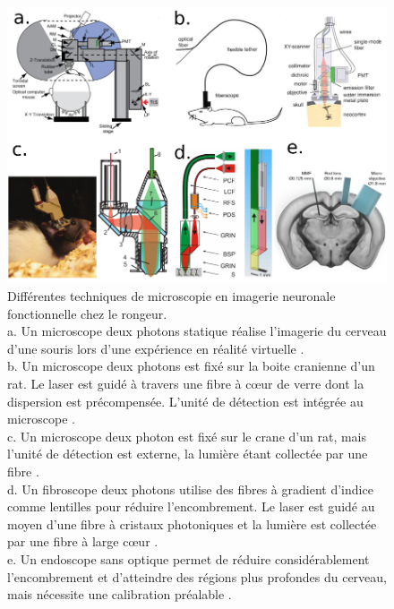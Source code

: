 \begin{figure}
\centering
\includegraphics[width=\textwidth]{./files/fiber_functional_imaging.svg.png}
\caption{Différentes techniques de microscopie en imagerie neuronale fonctionnelle chez le rongeur.\\
a. Un microscope deux photons statique réalise l'imagerie du cerveau d'une souris lors d'une expérience en réalité virtuelle \cite{dombeck_functional_2010}.\\
b. Un microscope deux photons est fixé sur la boite cranienne d'un rat. Le laser est guidé à travers une fibre à cœur de verre dont la dispersion est précompensée. L'unité de détection est intégrée au microscope \cite{helmchen_miniature_2001}.\\
c. Un microscope deux photon est fixé sur le crane d'un rat, mais l'unité de détection est externe, la lumière étant collectée par une fibre \cite{sawinski_visually_2009}. \\
d. Un fibroscope deux photons utilise des fibres à gradient d'indice comme lentilles pour réduire l'encombrement. Le laser est guidé au moyen d'une fibre à cristaux photoniques et la lumière est collectée par une fibre à large cœur \cite{engelbrecht_ultra-compact_2008}. \\
e. Un endoscope sans optique permet de réduire considérablement l'encombrement et d'atteindre des régions plus profondes du cerveau, mais nécessite une calibration préalable \cite{turtaev_high-fidelity_2018}.
}
\end{figure}



